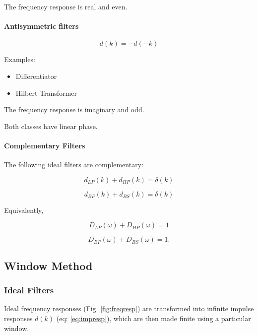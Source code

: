 The frequency response is real and even.

\vspace{0.5em}

\paragraph{Antisymmetric filters}

\[
d(k)=-d(-k)
\]

Examples:

\begin{itemize}
\item Differentiator
\item Hilbert Transformer
\end{itemize}

The frequency response is imaginary and odd.

\vspace{0.5em}

Both classes have linear phase.
\paragraph{Complementary Filters}

The following ideal filters are complementary:

\[
d_{LP}(k)+d_{HP}(k)=\delta(k)
\]

\[
d_{BP}(k)+d_{BS}(k)=\delta(k)
\]

Equivalently,

\[
D_{LP}(\omega)+D_{HP}(\omega)=1
\]

\[
D_{BP}(\omega)+D_{BS}(\omega)=1.
\]

\subsection{Window Method}
\subsubsection{Ideal Filters}
Ideal frequency responses (Fig. \ref{fig:freqresp}) are transformed into infinite impulse responses $d(k)$ (eq: \ref{eq:impresp}), which are then made finite using a particular window.

